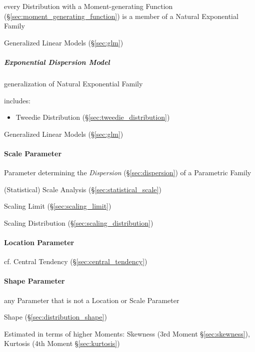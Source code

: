 every Distribution with a Moment-generating Function
(\S\ref{sec:moment_generating_function}) is a member of a Natural
Exponential Family

Generalized Linear Models (\S\ref{sec:glm})



\subparagraph{Exponential Dispersion Model}
\label{sec:exponential_dispersion}\hfill

generalization of Natural Exponential Family

includes:
\begin{itemize}
  \item Tweedie Distribution (\S\ref{sec:tweedie_distribution})
\end{itemize}

Generalized Linear Models (\S\ref{sec:glm})



\paragraph{Scale Parameter}\label{sec:scale_parameter}\hfill

Parameter determining the \emph{Dispersion} (\S\ref{sec:dispersion}) of a
Parametric Family

\fist (Statistical) Scale Analysis (\S\ref{sec:statistical_scale})

\fist Scaling Limit (\S\ref{sec:scaling_limit})

\fist Scaling Distribution (\S\ref{sec:scaling_distribution})



\paragraph{Location Parameter}\label{sec:location_parameter}\hfill

cf. Central Tendency (\S\ref{sec:central_tendency})



\paragraph{Shape Parameter}\label{sec:shape_parameter}\hfill

any Parameter that is not a Location or Scale Parameter

\fist Shape (\S\ref{sec:distribution_shape})

Estimated in terms of higher Moments: Skewness (3rd Moment
\S\ref{sec:skewness}), Kurtosis (4th Moment \S\ref{sec:kurtosis})



